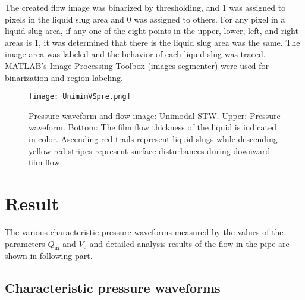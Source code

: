 \documentclass[aps,pre,preprint,groupedaddress,showkeys]{revtex4-2}
\begin{document}
The created flow image was binarized by thresholding, and 1 was assigned to pixels in the liquid slug area and 0 was assigned to others.
For any pixel in a liquid slug area, if any one of the eight points in the upper, lower, left, and right areas is 1, it was determined that there is the liquid slug area was the same. 
The image area was labeled and the behavior of each liquid slug was traced.
MATLAB's Image Processing Toolbox (images segmenter) were used for binarization and region labeling.

\begin{figure}
\texttt{[image: UnimimVSpre.png]} 
\caption{\label{UnimimVSpre}Pressure waveform and flow image: Unimodal STW. Upper: Pressure waveform. Bottom: The film flow thickness of the liquid is indicated in color. Ascending red trails represent liquid slugs while descending yellow-red stripes represent surface disturbances during downward film flow.}
\end{figure} 


\section{Result}\label{res}
The various characteristic pressure waveforms measured by the values of the parameters $Q_\mathrm{in}$ and $V_ \mathrm{c}$ and detailed analysis results of the flow in the pipe are shown in following part.
\subsection{Characteristic pressure waveforms}
\end{document}
